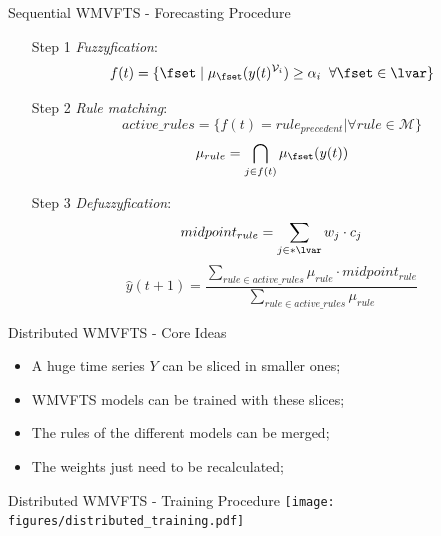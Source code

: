 \documentclass{beamer}
\begin{document}
\begin{frame}{Sequential WMVFTS - Forecasting Procedure}
\begin{enumerate}
\item [Step 1] \textit{Fuzzyfication}:
\begin{equation}
f(t) = \{\fset\; |\; \mu_{\fset}(y(t)^{\vari}) \geq \alpha_i\;\;\forall \fset \in \lvar\}
\end{equation}
\item [Step 2] \textit{Rule matching}: 
\begin{equation}
    active\_rules = \{ f(t) = rule_{precedent} | \forall rule \in \mathcal{M} \}
\end{equation}
\begin{equation}
    \mu_{rule} = \bigcap_{j \in f(t)} \mu_{\fset}(y(t))
\end{equation}
\item [Step 3] \textit{Defuzzyfication}:
\begin{equation}
midpoint_{rule} = \sum_{j \in *\lvar} w_j \cdot c_j
\end{equation}
\begin{equation}
\hat{y}(t+1) = \frac{\sum_{rule \in active\_rules} \mu_{rule} \cdot midpoint_{rule}}{\sum_{rule \in active\_rules} \mu_{rule}}
\end{equation}
\end{enumerate}
\end{frame}

\begin{frame}{Distributed WMVFTS - Core Ideas}
\begin{itemize}
    \item A huge time series $Y$ can be sliced in smaller ones;
    \item WMVFTS models can be trained with these slices;
    \item The rules of the different models can be merged;
    \item The weights just need to be recalculated;
\end{itemize}
\end{frame}

\begin{frame}{Distributed WMVFTS - Training Procedure}
\centering
\texttt{[image: figures/distributed\_training.pdf]}
\end{frame}
\end{document}
